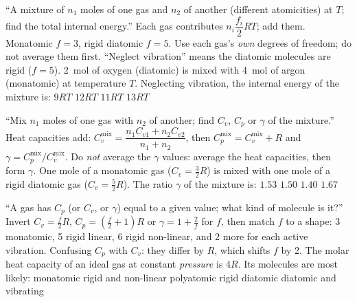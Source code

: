 {``A mixture of $n_1$ moles of one gas and $n_2$ of another (different atomicities) at $T$; find the
total internal energy.''}
{Each gas contributes $n_i\dfrac{f_i}{2}RT$; add them. Monatomic $f=3$, rigid diatomic $f=5$.}
{Use each gas's \emph{own} degrees of freedom; do not average them first. ``Neglect vibration'' means the
diatomic molecules are rigid ($f=5$).}
{\SI{2}{mol} of oxygen (diatomic) is mixed with \SI{4}{mol} of argon (monatomic) at temperature $T$.
Neglecting vibration, the internal energy of the mixture is:}
{$9RT$}
{$12RT$}
{$11RT$}
{$13RT$}

{``Mix $n_1$ moles of one gas with $n_2$ of another; find $C_v$, $C_p$ or $\gamma$ of the mixture.''}
{Heat capacities add: $C_v^{\text{mix}}=\dfrac{n_1C_{v1}+n_2C_{v2}}{n_1+n_2}$, then
$C_p^{\text{mix}}=C_v^{\text{mix}}+R$ and $\gamma=C_p^{\text{mix}}/C_v^{\text{mix}}$.}
{Do \emph{not} average the $\gamma$ values: average the heat capacities, then form $\gamma$.}
{One mole of a monatomic gas ($C_v=\tfrac32 R$) is mixed with one mole of a rigid diatomic gas
($C_v=\tfrac52 R$). The ratio $\gamma$ of the mixture is:}
{$1.53$}
{$1.50$}
{$1.40$}
{$1.67$}

{``A gas has $C_p$ (or $C_v$, or $\gamma$) equal to a given value; what kind of molecule is it?''}
{Invert $C_v=\tfrac f2R$, $C_p=(\tfrac f2+1)R$ or $\gamma=1+\tfrac2f$ for $f$, then match $f$ to a shape:
3 monatomic, 5 rigid linear, 6 rigid non-linear, and 2 more for each active vibration.}
{Confusing $C_p$ with $C_v$: they differ by $R$, which shifts $f$ by 2.}
{The molar heat capacity of an ideal gas at constant \emph{pressure} is $4R$. Its molecules are most likely:}
{monatomic}
{rigid and non-linear polyatomic}
{rigid diatomic}
{diatomic and vibrating}


